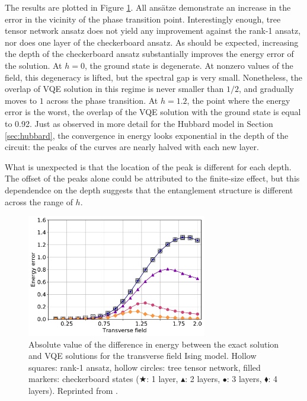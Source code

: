 The results are plotted in Figure \ref{fig:dE_ising}. All ans\"atze demonstrate an increase in the error in the vicinity of the phase transition point. Interestingly enough, tree tensor network ansatz does not yield any improvement against the rank-1 ansatz, nor does one layer of the checkerboard ansatz. As should be expected, increasing the depth of the checkerboard ansatz substantially improves the energy error of the solution. At $h = 0$, the ground state is degenerate. At nonzero values of the field, this degeneracy is lifted, but the spectral gap is very small. Nonetheless, the overlap of VQE solution in this regime is never smaller than $1/2$, and gradually moves to $1$ across the phase transition. At $h = 1.2$, the point where the energy error is the worst, the overlap of the VQE solution with the ground state is equal to 0.92. Just as observed in more detail for the Hubbard model in Section \ref{sec:hubbard}, the convergence in energy looks exponential in the depth of the circuit: the peaks of the curves are nearly halved with each new layer. 

What is unexpected is that the location of the peak is different for each depth. The offset of the peaks alone could be attributed to the finite-size effect, but this dependendce on the depth suggests that the entanglement structure is different across the range of $h$.

\begin{figure}
    \centering
    \includegraphics[width=0.7\textwidth]{figures/dE_ising.pdf}
    \caption{Absolute value of the difference in energy between the exact solution and VQE solutions for the transverse field Ising model. Hollow squares: rank-1 ansatz, hollow circles: tree tensor network, filled markers: checkerboard states ($\bigstar$: 1 layer, $\blacktriangle$: 2 layers, $\bullet$: 3 layers, $\blacklozenge$: 4 layers). Reprinted from \cite{uvarov_machine_2020}.}
    \label{fig:dE_ising}
\end{figure}

